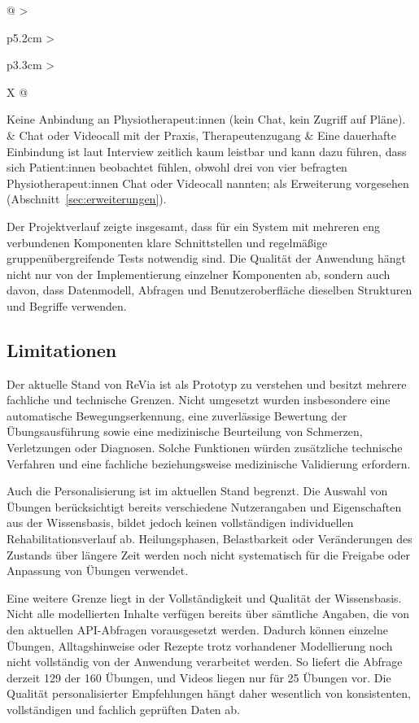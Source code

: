 {\begin{xltabular}{\textwidth}{@{} >{\raggedright\arraybackslash}p{5.2cm} >{\raggedright\arraybackslash}p{3.3cm} >{\raggedright\arraybackslash}X @{}}
    Keine Anbindung an Physiotherapeut:innen (kein Chat, kein Zugriff auf Pläne). & Chat oder Videocall mit der Praxis, Therapeutenzugang & Eine dauerhafte Einbindung ist laut Interview zeitlich kaum leistbar und kann dazu führen, dass sich Patient:innen beobachtet fühlen, obwohl drei von vier befragten Physiotherapeut:innen Chat oder Videocall nannten; als Erweiterung vorgesehen (Abschnitt~\ref{sec:erweiterungen}). \\
\end{xltabular}
}

Der Projektverlauf zeigte insgesamt, dass für ein System mit mehreren eng verbundenen Komponenten klare Schnittstellen und regelmäßige gruppenübergreifende Tests notwendig sind. Die Qualität der Anwendung hängt nicht nur von der Implementierung einzelner Komponenten ab, sondern auch davon, dass Datenmodell, Abfragen und Benutzeroberfläche dieselben Strukturen und Begriffe verwenden.

\subsection{Limitationen}

Der aktuelle Stand von ReVia ist als Prototyp zu verstehen und besitzt mehrere fachliche und technische Grenzen. Nicht umgesetzt wurden insbesondere eine automatische Bewegungserkennung, eine zuverlässige Bewertung der Übungsausführung sowie eine medizinische Beurteilung von Schmerzen, Verletzungen oder Diagnosen. Solche Funktionen würden zusätzliche technische Verfahren und eine fachliche beziehungsweise medizinische Validierung erfordern.

Auch die Personalisierung ist im aktuellen Stand begrenzt. Die Auswahl von Übungen berücksichtigt bereits verschiedene Nutzerangaben und Eigenschaften aus der Wissensbasis, bildet jedoch keinen vollständigen individuellen Rehabilitationsverlauf ab. Heilungsphasen, Belastbarkeit oder Veränderungen des Zustands über längere Zeit werden noch nicht systematisch für die Freigabe oder Anpassung von Übungen verwendet.

Eine weitere Grenze liegt in der Vollständigkeit und Qualität der Wissensbasis. Nicht alle modellierten Inhalte verfügen bereits über sämtliche Angaben, die von den aktuellen API-Abfragen vorausgesetzt werden. Dadurch können einzelne Übungen, Alltagshinweise oder Rezepte trotz vorhandener Modellierung noch nicht vollständig von der Anwendung verarbeitet werden. So liefert die Abfrage derzeit 129 der 160 Übungen, und Videos liegen nur für 25 Übungen vor. Die Qualität personalisierter Empfehlungen hängt daher wesentlich von konsistenten, vollständigen und fachlich geprüften Daten ab.

